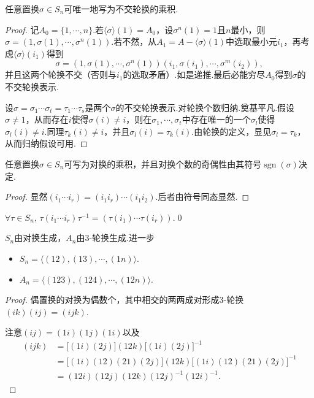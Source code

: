\begin{prop}
	任意置换$\sigma\in S_n$可唯一地写为不交轮换的乘积.
\end{prop}
\begin{proof}
	记$A_0=\{1,\cdots,n\}$.若$\langle \sigma\rangle (1)=A_0$，设$\sigma^n(1)=1$且$n$最小，则$\sigma=(1,\sigma(1),\cdots,\sigma^n(1))$.若不然，从$A_1=A-\langle \sigma\rangle (1)$中选取最小元$i_1$，再考虑$\langle \sigma\rangle (i_1)$得到
	\[
		\sigma=(1,\sigma(1),\cdots,\sigma^n(1))(i_1,\sigma(i_1),\cdots,\sigma^m(i_2)),
	\]
	并且这两个轮换\footnotemark 不交（否则与$i_1$的选取矛盾）.如是递推.最后必能穷尽$A_0$得到$\sigma$的不交轮换表示.

	设$\sigma=\sigma_1\cdots\sigma_t=\tau_1\cdots\tau_s$是两个$\sigma$的不交轮换表示.对轮换个数归纳.奠基平凡.假设$\sigma\ne 1$，从而存在$i$使得$\sigma(i)\ne i$，则在$\sigma_1,\cdots,\sigma_t$中存在唯一的一个$\sigma_l$使得$\sigma_l(i)\ne i$.同理$\tau_k(i)\ne i$，并且$\sigma_l(i)=\tau_k(i)$.由轮换的定义，显见$\sigma_l=\tau_k$，从而归纳假设可用.
\end{proof}
\begin{cor*}
	任意置换$\sigma\in S_n$可写为对换的乘积，并且对换个数的奇偶性由其符号$\operatorname*{sgn}(\sigma)$决定.
\end{cor*}
\begin{proof}
	显然$(i_1\cdots i_r)=(i_1i_r)\cdots(i_1i_2)$.后者由符号同态显然.
\end{proof}
\begin{lemma*}[(共轭)]
	$\forall\tau\in S_n,\,\tau(i_1\cdots i_r)\tau^{-1}=(\tau(i_1)\cdots\tau(i_r))$.\qed\hypertarget{ConjugationInSymmetry}{}
\end{lemma*}
\begin{cor*}
	$S_n$由对换生成，$A_n$由3-轮换生成.进一步
	\begin{itemize}
		\item $S_n=\langle (12),(13),\cdots,(1n)\rangle $.
		\item $A_n=\langle (123),(124),\cdots,(12n)\rangle $.
	\end{itemize}
\end{cor*}
\begin{proof}
	偶置换的对换为偶数个，其中相交的两两成对形成3-轮换$(ik)(ij)=(ijk)$.

	注意$(ij)=(1i)(1j)(1i)$以及
	\begin{align*}
		(ijk) & =\big[(1i)(2j)\big](12k)\big[(1i)(2j)\big]^{-1}                 \\
		      & =\big[(1i)(12)(21)(2j)\big](12k)\big[(1i)(12)(21)(2j)\big]^{-1} \\
		      & =(12i)(12j)(12k)(12j)^{-1}(12i)^{-1}.
	\end{align*}
\end{proof}

